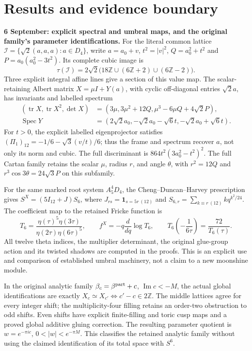 \section{Results and evidence boundary}

\noindent\textbf{6 September: explicit spectral and umbral maps, and the original family's parameter identifications.}
For the literal common lattice $\mathcal I=\{\sqrt2(a,a,a):a\in D_4\}$,
write $a=a_0+v$, $t^2=|v|^2$, $Q=a_0^2+t^2$ and
$P=a_0(a_0^2-3t^2)$. Its complete cubic image is
\[
 \tau(\mathcal I)=2\sqrt2\bigl(18\mathbb Z\cup(6\mathbb Z+2)
                                      \cup(6\mathbb Z-2)\bigr).
\]
Three explicit integral affine lines give a section of this value map.
The scalar-retaining Albert matrix $X=\mu I+Y(a)$, with cyclic
off-diagonal entries $\sqrt2a$, has invariants and labelled spectrum
\[
\begin{aligned}
 (\operatorname{tr}X,\operatorname{tr}X^2,\det X)
   &=(3\mu,3\mu^2+12Q,\mu^3-6\mu Q+4\sqrt2P),\\
 \operatorname{Spec}Y
   &=(2\sqrt2a_0,-\sqrt2a_0-\sqrt6t,-\sqrt2a_0+\sqrt6t).
\end{aligned}
\]
For $t>0$, the explicit labelled eigenprojector satisfies
$(\Pi_1)_{12}=-1/6-\sqrt3(v/t)/6$; thus the frame and spectrum
recover $a$, not only its norm and cubic. The full discriminant is
$864t^2(3a_0^2-t^2)^2$. The full Cartan family retains the scalar
$\mu$, radius $r$, and angle $\theta$, with $r^2=12Q$ and
$r^3\cos3\theta=24\sqrt3P$ on this subfamily.

For the same marked root system $A_5^4D_4$, the
Cheng--Duncan--Harvey prescription gives
$S^X=(5I_{12}+J)S_6$, where $J_{rs}=\mathbf1_{s=5r\ (12)}$ and
$S_{6,r}=\sum_{k\equiv r\ (12)}kq^{k^2/24}$.
The coefficient map to the retained Fricke function is
\[
 T_6=\frac{\eta(\tau)^5\eta(3\tau)}{\eta(2\tau)\eta(6\tau)^5},
 \qquad f^X=-q\frac{d}{dq}\log T_6,
 \qquad T_6\!\left(-\frac1{6\tau}\right)=\frac{72}{T_6(\tau)}.
\]
All twelve theta indices, the multiplier determinant, the original
glue-group action and its twisted shadows are computed in the proofs.
This is an explicit use and comparison of established umbral machinery,
not a claim to a new moonshine module.

In the original analytic family $\beta_c=\beta^{\rm part}+c$,
$\operatorname{Im}c<-M$, the actual global identifications are exactly
$X_c\simeq X_{c'}\Longleftrightarrow c'-c\in2\mathbb Z$.
The middle lattices agree for every integer shift; the multiplicity-four
filling retains an order-two obstruction to odd shifts. Even shifts have
explicit finite-filling and toric cusp maps and a proved global additive
gluing correction. The resulting parameter quotient is
$w=e^{-\pi ic}$, $0<|w|<e^{-\pi M}$.
This classifies the retained analytic family without using the claimed
identification of its total space with $S^6$.


